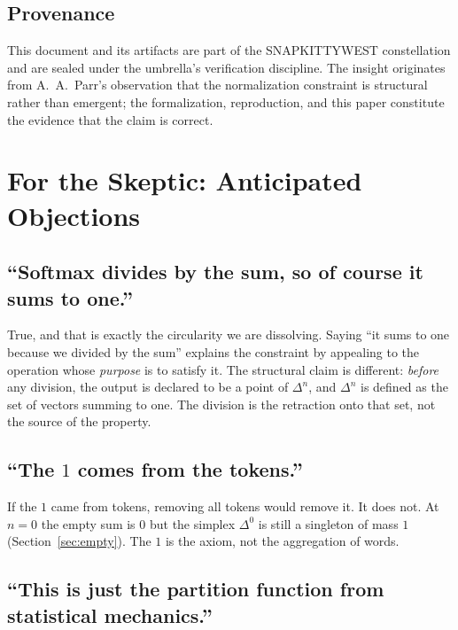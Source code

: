 \documentclass[11pt]{article}
\newcommand{\simplex}[1]{\Delta^{#1}}
\begin{document}
\subsection{Provenance}
\label{sec:prov-prov}

This document and its artifacts are part of the SNAPKITTYWEST constellation and
are sealed under the umbrella's verification discipline. The insight originates
from A.\ A.\ Parr's observation that the normalization constraint is
structural rather than emergent; the formalization, reproduction, and this
paper constitute the evidence that the claim is correct.

\section{For the Skeptic: Anticipated Objections}
\label{sec:skeptic}

\subsection{``Softmax divides by the sum, so of course it sums to one.''}
\label{sec:sk-1}

True, and that is exactly the circularity we are dissolving. Saying ``it sums to
one because we divided by the sum'' explains the constraint by appealing to the
operation whose \emph{purpose} is to satisfy it. The structural claim is
different: \emph{before} any division, the output is declared to be a point of
$\simplex{n}$, and $\simplex{n}$ is defined as the set of vectors summing to
one. The division is the retraction onto that set, not the source of the
property.

\subsection{``The $1$ comes from the tokens.''}
\label{sec:sk-2}

If the $1$ came from tokens, removing all tokens would remove it. It does not.
At $n=0$ the empty sum is $0$ but the simplex $\simplex{0}$ is still a
singleton of mass $1$ (Section~\ref{sec:empty}). The $1$ is the axiom, not the
aggregation of words.

\subsection{``This is just the partition function from statistical mechanics.''}
\label{sec:sk-3}
\end{document}
